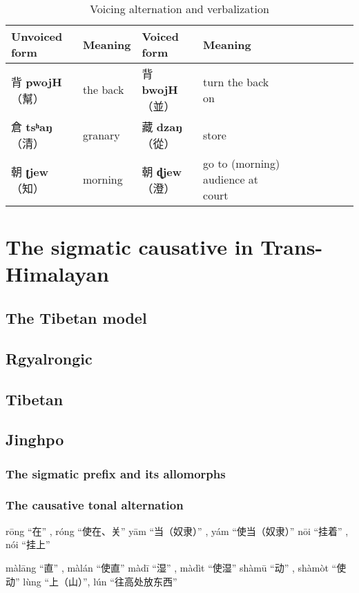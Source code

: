 \documentclass[oneside,a4paper,11pt]{article}
\newcommand{\ipa}[1]{\textbf{{\phon\mbox{#1}}}} %
\newcommand{\zh}[1]{{\cn #1}}
\newcommand{\zhc}[2]{\zh{#1} \ipa{#2}}
\newcommand{\mc}[1]{\zh{（#1）}}
\begin{document}
\begin{table}[H]
\caption{Voicing alternation and verbalization}
\begin{tabular}{llllllllll}
\toprule
Unvoiced form &Meaning & Voiced form & Meaning\\
\midrule
\zhc{背}{pwojH} \mc{幫}	&the back& \zhc{背}{bwojH} \mc{並} & turn the back on \\
\zhc{倉}{tsʰaŋ} \mc{清}	&granary & \zhc{藏}{dzaŋ} \mc{從} & store \\
\zhc{朝}{ʈjew} \mc{知}	&morning  & \zhc{朝}{ɖjew} \mc{澄} & go to (morning) audience at court \\
\bottomrule
\end{tabular}
\end{table}


\section{The sigmatic causative in Trans-Himalayan}

\subsection{The Tibetan model}

\subsection{Rgyalrongic}
\subsection{Tibetan}
\subsection{Jinghpo}

\subsubsection{The sigmatic prefix and its allomorphs}
\subsubsection{The causative tonal alternation}
rōng “在” , róng “使在、关”
yām “当（奴隶）” , yám “使当（奴隶）”
nōi “挂着” , nói “挂上”


màlāng “直” , màlán “使直”
màdī “湿” , màdìt “使湿”
shàmū “动” , shàmòt “使动”
lùng “上（山）”, lún “往高处放东西”
\end{document}
